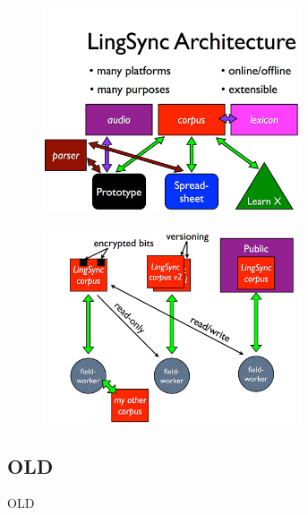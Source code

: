 \documentclass{beamer}
\begin{document}
\begin{frame}
\begin{figure}
\begin{center}
\includegraphics[width=3in]{../figures/architecture}
\label{lingsync:architecture}
\end{center}
\end{figure}
\end{frame}


\begin{frame}
\begin{figure}
\begin{center}
\includegraphics[width=3in]{../figures/corpora}
\label{lingsync:corpora}
\end{center}
\end{figure}
\end{frame}

\subsection{OLD}\label{sec:old}

\begin{frame}
OLD
\end{frame}

\end{document}
